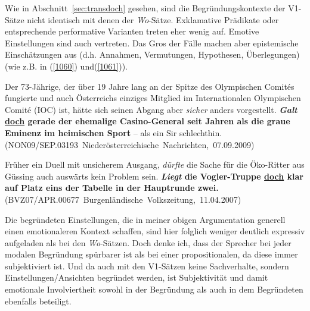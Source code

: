 {Wie in Abschnitt~\ref{sec:transdoch} gesehen, sind die Begründungskontexte der V1-Sätze nicht identisch mit denen der \textit{Wo}-Sätze. Exklamative Prädikate oder entsprechende performative Varianten treten eher wenig auf. Emotive Einstellungen sind auch vertreten. Das Gros der Fälle machen aber epistemische Einschätzungen aus (d.h. Annahmen, Vermutungen, Hypothesen, Überlegungen) (wie z.B. in (\ref{1060}) und(\ref{1061})).

\begin{exe}
	\ex\label{1060} 
	\scriptsize
	Der 73-Jährige, der über 19 Jahre lang an der Spitze des Olympischen Comités fungierte und auch Österreichs einziges Mitglied im Internationalen 			Olympischen Comité (IOC) ist, hätte sich seinen Abgang aber \emph{sicher} anders vorgestellt. \textbf{\textit{Galt} \underline{doch} gerade der 			ehemalige Casino-General seit Jahren als die graue Eminenz im heimischen Sport} – als ein Sir schlechthin. 
	\newline              		
	\hbox{}\hfill\hbox {(NON09/SEP.03193 Niederösterreichische Nachrichten, 07.09.2009)}
\end{exe}
				 
\begin{exe}
	\ex\label{1061} 
	\scriptsize
	Früher ein Duell mit unsicherem Ausgang, \emph{dürfte} die Sache für die Öko-Ritter aus Güssing auch auswärts kein Problem sein. \textbf{\textit{Liegt} 	die Vogler-Truppe \underline{doch} klar auf Platz eins der Tabelle in der Hauptrunde zwei.}
	\hfill\hbox {(BVZ07/APR.00677 Burgenländische Volkszeitung, 11.04.2007)}
\end{exe}	
Die begründeten Einstellungen, die in meiner obigen Argumentation generell einen emotionaleren Kontext schaffen, sind hier folglich weniger deutlich expressiv aufgeladen als bei den \textit{Wo}-Sätzen. Doch denke ich, dass der Sprecher bei jeder modalen Begründung  spürbarer ist als bei einer propositionalen, da diese immer subjektiviert  ist. Und da auch mit den V1-Sätzen keine Sachverhalte, sondern Einstellungen/Ansichten begründet werden, ist Subjektivität und damit emotionale Involviertheit sowohl in der Begründung als auch in dem Begründeten ebenfalls beteiligt.

}
